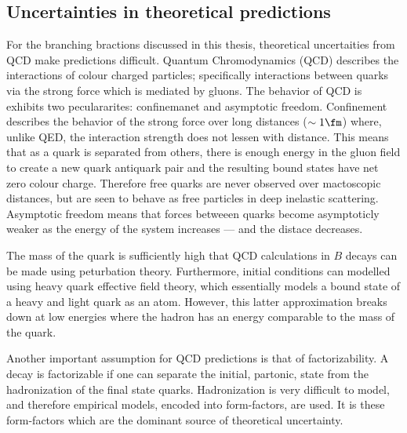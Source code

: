 \subsection{Uncertainties in theoretical predictions}


For the branching bractions discussed in this thesis, theoretical uncertaities from QCD make
predictions difficult.
Quantum Chromodynamics (QCD) describes the interactions of colour charged particles; specifically
interactions between quarks via the strong force which is mediated by gluons.
The behavior of QCD is exhibits two peculararites: confinemanet and asymptotic freedom.
Confinement describes the behavior of the strong force over long distances ($\sim1\fm$)
where, unlike QED, the interaction strength does not lessen with distance.
This means that as a quark is separated from others, there is enough energy in the gluon field to
create a new quark antiquark pair and the resulting bound states have net zero colour charge.
Therefore free quarks are never observed over mactoscopic distances, but are seen to behave as free
particles in deep inelastic scattering.
Asymptotic freedom means that forces betweeen quarks become asymptoticly weaker as the energy of
the system increases --- and the distace decreases.


The mass of the \bquark quark is sufficiently high that QCD calculations in $B$ decays can be made
using peturbation theory.
Furthermore, initial conditions can modelled using heavy quark effective field theory, which
essentially models a bound state of a heavy and light quark as an atom.
However, this latter approximation breaks down at low energies where the hadron has an energy
comparable to the mass of the \bquark quark.

Another important assumption for QCD predictions is that of factorizability.
A decay is factorizable if one can separate the initial, partonic, state from the hadronization of
the final state quarks.
Hadronization is very difficult to model, and therefore empirical models, encoded into
form-factors, are used.
It is these form-factors which are the dominant source of theoretical uncertainty.


